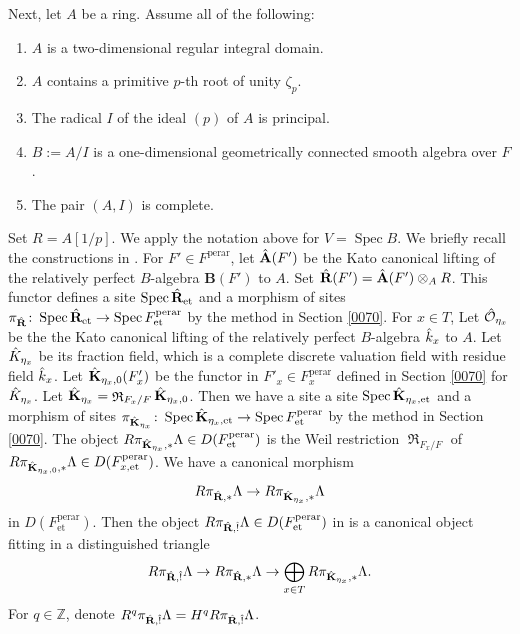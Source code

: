 \documentclass{amsart}
\theoremstyle{remark}
\numberwithin{equation}{section}
\newcommand{\Order}{\mathcal{O}}
\newcommand{\tensor}{\mathbin{\otimes}}
\newcommand{\Z}{\mathbb{Z}}
\newcommand{\et}{\mathrm{et}}
\newcommand{\perar}{\mathrm{perar}}
\newcommand{\alg}[1]{\mathbf{#1}}
\DeclareMathOperator{\Spec}{Spec}
\DeclareMathOperator{\Weil}{\mathfrak{R}}
\begin{document}
Next, let $A$ be a ring.
Assume all of the following:
\begin{enumerate}
	\item
		$A$ is a two-dimensional regular integral domain.
	\item
		$A$ contains a primitive $p$-th root of unity $\zeta_{p}$.
	\item
		The radical $I$ of the ideal $(p)$ of $A$ is principal.
	\item
		$B := A / I$ is a one-dimensional geometrically connected smooth algebra over $F$.
	\item
		The pair $(A, I)$ is complete.
\end{enumerate}
Set $R = A[1 / p]$.
We apply the notation above for $V = \Spec B$.
We briefly recall the constructions in \cite[Section 9.2]{Suz24}.
For $F' \in F^{\perar}$,
let $\Hat{\alg{A}}(F')$ be the Kato canonical lifting
of the relatively perfect $B$-algebra $\alg{B}(F')$ to $A$.
Set $\Hat{\alg{R}}(F') = \Hat{\alg{A}}(F') \tensor_{A} R$.
This functor defines a site $\Spec \Hat{\alg{R}}_{\et}$ 
and a morphism of sites $\pi_{\Hat{\alg{R}}} \colon \Spec \Hat{\alg{R}}_{\et} \to \Spec F^{\perar}_{\et}$
by the method in Section \ref{0070}.
For $x \in T$, Let $\Hat{\Order}_{\eta_{x}}$ be the the Kato canonical lifting
of the relatively perfect $B$-algebra $\Hat{k}_{x}$ to $A$.
Let $\Hat{K}_{\eta_{x}}$ be its fraction field,
which is a complete discrete valuation field with residue field $\Hat{k}_{x}$.
Let $\Hat{\alg{K}}_{\eta_{x}, 0}(F'_{x})$ be the functor in $F'_{x} \in F_{x}^{\perar}$
defined in Section \ref{0070} for $\Hat{K}_{\eta_{x}}$.
Let $\Hat{\alg{K}}_{\eta_{x}} = \Weil_{F_{x} / F} \Hat{\alg{K}}_{\eta_{x}, 0}$.
Then we have a site a site $\Spec \Hat{\alg{K}}_{\eta_{x}, \et}$
and a morphism of sites
$\pi_{\Hat{\alg{K}}_{\eta_{x}}} \colon \Spec \Hat{\alg{K}}_{\eta_{x}, \et} \to \Spec F^{\perar}_{\et}$
by the method in Section \ref{0070}.
The object $R \pi_{\Hat{\alg{K}}_{\eta_{x}}, \ast} \Lambda \in D(F^{\perar}_{\et})$
is the Weil restriction $\Weil_{F_{x} / F}$ of
$R \pi_{\Hat{\alg{K}}_{\eta_{x}, 0}, \ast} \Lambda \in D(F^{\perar}_{x, \et})$.
We have a canonical morphism
	\[
			R \pi_{\Hat{\alg{R}}, \ast} \Lambda
		\to
			R \pi_{\Hat{\alg{K}}_{\eta_{x}}, \ast} \Lambda
	\]
in $D(F^{\perar}_{\et})$.
Then the object $R \pi_{\Hat{\alg{R}}, \Hat{!}} \Lambda \in D(F^{\perar}_{\et})$ in \cite[Section 9.2]{Suz24}
is a canonical object fitting in a distinguished triangle
	\[
			R \pi_{\Hat{\alg{R}}, \Hat{!}} \Lambda
		\to
			R \pi_{\Hat{\alg{R}}, \ast} \Lambda
		\to
			\bigoplus_{x \in T}
				R \pi_{\Hat{\alg{K}}_{\eta_{x}}, \ast} \Lambda.
	\]
For $q \in \Z$, denote
$R^{q} \pi_{\Hat{\alg{R}}, \Hat{!}} \Lambda = H^{q} R \pi_{\Hat{\alg{R}}, \Hat{!}} \Lambda$.
\end{document}
